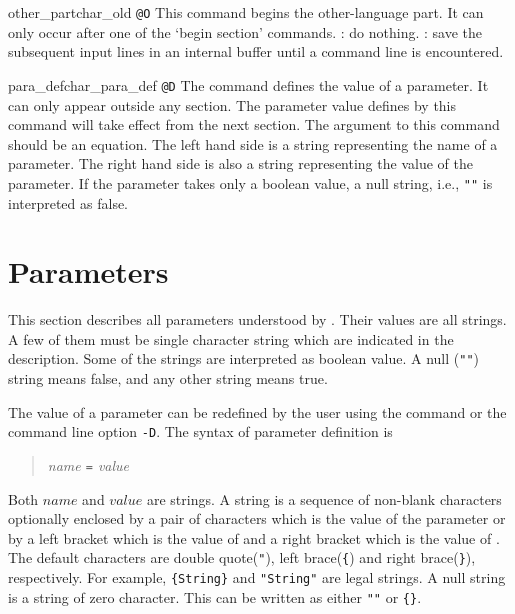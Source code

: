 \begin{describecmd}{other_part}{char_old}{\none}
{\verb|@O|}
\describe
This command begins the other-language part. It can only occur after one
of the `begin section' commands.
\tangleaction: do nothing.
\weaveaction: save the subsequent input lines in an internal buffer
 until a command line is encountered.
\end{describecmd}

\begin{describecmd}{para_def}{char_para_def}{\man}
{\verb|@D|}
\describe
The command defines the value of a parameter.
It can only appear outside any section. The parameter value defines by
this command will take effect from the next section.
The argument to this command should be an equation. The left hand side
is a string representing the name of a parameter. The right hand side
is also a string representing the value of the parameter. If the
parameter takes only a boolean value, a null string, i.e., \verb|""| is
interpreted as false.
\end{describecmd}


\section{Parameters}\label{sec-para}

This section describes all parameters understood by \mweb. Their
values are all strings. A few of them must be single character string
which are indicated in the description. Some of the strings are
interpreted as boolean value. A null ({\tt""}) string means false, and
any other string means true. 

The value of a parameter can be redefined by the user using the
 command or the command line option {\tt -D}. The syntax
of parameter definition is
\begin{quote}\it
name {\tt =} value
\end{quote}
Both $name$ and $value$ are strings. A string is a sequence of
non-blank characters optionally enclosed by a pair of characters which
is the value of the parameter  or by a left
bracket which is the value of  and a right
bracket which is the value of . The default
characters are  double quote({\tt "}), left brace({\tt\{}) and
right brace({\tt\}}), respectively. For example, \verb|{String}| and
\verb|"String"| are legal strings. A null string is a string of zero
character. This can be written as either \verb|""| or \verb|{}|.

